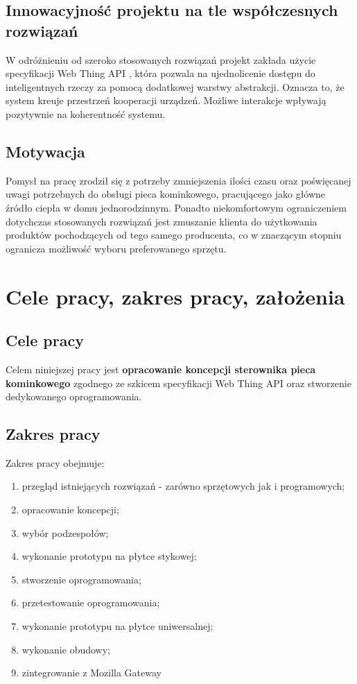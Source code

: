 \documentclass[11pt]{report}
\begin{document}
 \section{Innowacyjność projektu na tle współczesnych rozwiązań}
 W odróżnieniu od szeroko stosowanych rozwiązań projekt zakłada użycie specyfikacji Web Thing API \cite{WebThing2020}, która pozwala na ujednolicenie dostępu do inteligentnych rzeczy za pomocą dodatkowej warstwy abstrakcji. Oznacza to, że system kreuje przestrzeń kooperacji urządzeń. Możliwe interakcje wpływają pozytywnie na koherentność systemu.
 
 \section{Motywacja}
Pomysł na pracę zrodził się z potrzeby zmniejszenia ilości czasu oraz poświęcanej uwagi potrzebnych do obsługi pieca kominkowego, pracującego jako główne źródło ciepła w domu jednorodzinnym. Ponadto niekomfortowym ograniczeniem dotychczas stosowanych rozwiązań jest zmuszanie klienta do użytkowania produktów pochodzących od tego samego producenta, co w znaczącym stopniu ogranicza możliwość wyboru preferowanego sprzętu.


 \chapter{Cele pracy, zakres pracy, założenia}\label{ch:cele}

 \section{Cele pracy}
 Celem niniejszej pracy jest \textbf{opracowanie koncepcji sterownika pieca kominkowego} zgodnego ze szkicem specyfikacji Web Thing API oraz stworzenie dedykowanego oprogramowania.

 \section{Zakres pracy}
 Zakres pracy obejmuje:
 \begin{enumerate}
 \item przegląd istniejących rozwiązań - zarówno sprzętowych jak i programowych;
 \item opracowanie koncepcji;
 \item wybór podzespołów;
 \item wykonanie prototypu na płytce stykowej;
 \item stworzenie oprogramowania;
 \item przetestowanie oprogramowania; 
 \item wykonanie prototypu na płytce uniwersalnej;
 \item wykonanie obudowy;
 \item zintegrowanie z Mozilla Gateway
 \end{enumerate}
 
\end{document}
